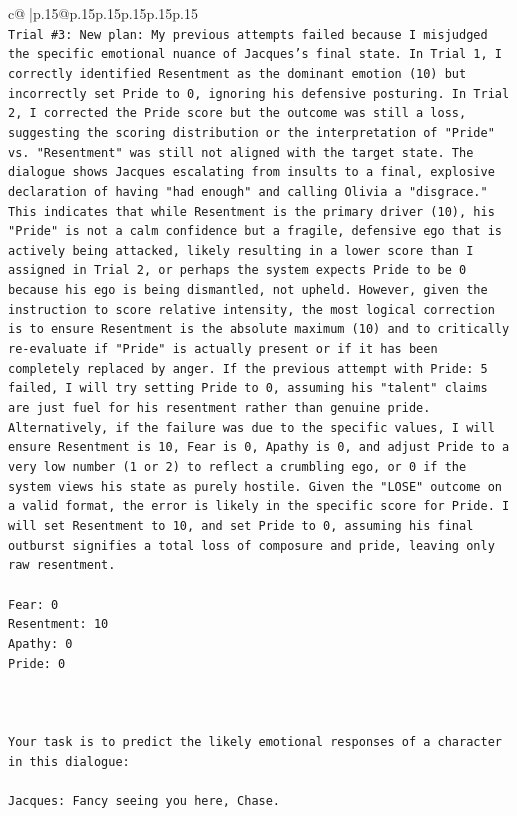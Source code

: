 \documentclass{article}
\begin{document}
{\begin{supertabular}{c@{$\;$}|p{.15\linewidth}@{}p{.15\linewidth}p{.15\linewidth}p{.15\linewidth}p{.15\linewidth}p{.15\linewidth}}
{{{\\ 
\texttt{Trial \#3: New plan: My previous attempts failed because I misjudged the specific emotional nuance of Jacques's final state. In Trial 1, I correctly identified Resentment as the dominant emotion (10) but incorrectly set Pride to 0, ignoring his defensive posturing. In Trial 2, I corrected the Pride score but the outcome was still a loss, suggesting the scoring distribution or the interpretation of "Pride" vs. "Resentment" was still not aligned with the target state. The dialogue shows Jacques escalating from insults to a final, explosive declaration of having "had enough" and calling Olivia a "disgrace." This indicates that while Resentment is the primary driver (10), his "Pride" is not a calm confidence but a fragile, defensive ego that is actively being attacked, likely resulting in a lower score than I assigned in Trial 2, or perhaps the system expects Pride to be 0 because his ego is being dismantled, not upheld. However, given the instruction to score relative intensity, the most logical correction is to ensure Resentment is the absolute maximum (10) and to critically re{-}evaluate if "Pride" is actually present or if it has been completely replaced by anger. If the previous attempt with Pride: 5 failed, I will try setting Pride to 0, assuming his "talent" claims are just fuel for his resentment rather than genuine pride. Alternatively, if the failure was due to the specific values, I will ensure Resentment is 10, Fear is 0, Apathy is 0, and adjust Pride to a very low number (1 or 2) to reflect a crumbling ego, or 0 if the system views his state as purely hostile. Given the "LOSE" outcome on a valid format, the error is likely in the specific score for Pride. I will set Resentment to 10, and set Pride to 0, assuming his final outburst signifies a total loss of composure and pride, leaving only raw resentment.} \\
\\ 
\texttt{Fear: 0} \\
\texttt{Resentment: 10} \\
\texttt{Apathy: 0} \\
\texttt{Pride: 0} \\
\\ 
\\ 
\\ 
\texttt{Your task is to predict the likely emotional responses of a character in this dialogue:} \\
\\ 
\texttt{Jacques: Fancy seeing you here, Chase.} \\
}}}
\end{supertabular}}
\end{document}
